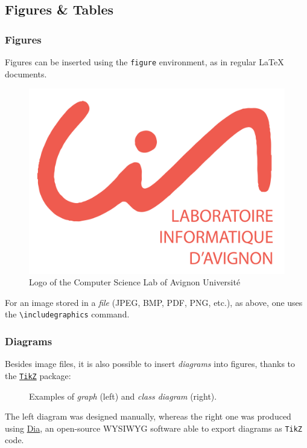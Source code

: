 \documentclass[10pt,    %
    english,            %
    xcolor=table,       %
    envcountsect,        %
    aspectratio=169     %
]{beamer}
\begin{document}
\subsection{Figures \& Tables}
\begin{frame}
    \frametitle{Figures}
    
    Figures can be inserted using the \texttt{figure} environment, as in regular \LaTeX{} documents.
    
    \begin{figure}[H]
        \centering
        \includegraphics[scale=0.05]{images/lia_logo.pdf}
        \vspace{-0.5cm}
        \caption{Logo of the Computer Science Lab of Avignon Université}
        \label{fig:LIAlogo}
    \end{figure}
    
    \vspace{0.25cm}
    For an image stored in a \textit{file} (JPEG, BMP, PDF, PNG, etc.), as above, one uses the \texttt{\textbackslash{}includegraphics} command.
\end{frame}

\begin{frame}
    \frametitle{Diagrams}
    Besides image files, it is also possible to insert \textit{diagrams} into figures, thanks to the \href{https://ctan.org/pkg/pgf?lang=en}{\texttt{TikZ}} package:

    \begin{figure}[H]
        \centering
        \resizebox{0.35\linewidth}{!}{}
        \hspace{0.25cm}\hspace{0.25cm}
        \resizebox{0.45\linewidth}{!}{}
        \caption{Examples of \textit{graph} (left) and \textit{class diagram} (right).}
        \label{fig:diagrams}
    \end{figure}
    
    The left diagram was designed manually, whereas the right one was produced using \href{http://dia-installer.de}{Dia}, an open-source WYSIWYG software able to export diagrams as \texttt{TikZ} code.
\end{frame}
    
\end{document}
